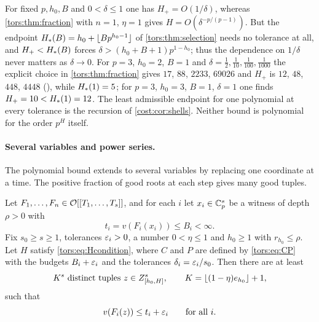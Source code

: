 \begin{remark}
For fixed $p,h_0,B$ and $0<\delta\le1$ one has $H_+=O(1/\delta)$, whereas
\cref{tors:thm:fraction} with $n=1$, $\eta=1$ gives $H=O(\delta^{-p/(p-1)})$. But the
endpoint $H_{*}(B)=h_0+\lfloor Bp^{h_0-1}\rfloor$ of \cref{tors:thm:selection} needs no
tolerance at all, and $H_+<H_{*}(B)$ forces $\delta>(h_0+B+1)p^{1-h_0}$; thus the dependence on $1/\delta$ never matters as $\delta\to0$. For
$p=3$, $h_0=2$, $B=1$ and $\delta=\tfrac12,\tfrac1{10},\tfrac1{100},\tfrac1{1000}$ the
explicit choice in \cref{tors:thm:fraction} gives $17$, $88$, $2233$, $69026$ and $H_+$ is
$12$, $48$, $448$, $4448$
(), while
$H_{*}(1)=5$; for $p=3$, $h_0=3$, $B=1$, $\delta=1$ one finds $H_+=10<H_{*}(1)=12$.
The least admissible endpoint for one polynomial at every tolerance is the recursion of
\cref{cost:cor:shells}. Neither bound is polynomial for the order $p^H$ itself.
\end{remark}


\paragraph{Several variables and power series.}
The polynomial bound extends to several variables by replacing one coordinate at a time.
The positive fraction of good roots at each step gives many good tuples.

\begin{theorem}\label{tors:thm:packet}
Let $F_1,\dots,F_n\in\mathcal{O}[[T_1,\dots,T_s]]$, and for each $i$ let $x_i\in\mathbb{C}_p^s$ be a
witness of depth $\rho>0$ with
\[
  t_i=v(F_i(x_i))\le B_i<\infty .
\]
Fix $s_0\ge s\ge1$, tolerances $\varepsilon_i>0$, a number $0<\eta\le1$ and $h_0\ge1$ with
$r_{h_0}\le\rho$. Let $H$ satisfy \eqref{tors:eq:Hcondition}, where $C$ and $P$ are
defined by \eqref{tors:eq:CP} with the budgets $B_i+\varepsilon_i$ and the tolerances
$\delta_i=\varepsilon_i/s_0$. Then there are at least
\[
  K^s\ \text{distinct tuples }z\in Z_{[h_0,H]}^s,\qquad
  K=\lfloor(1-\eta)e_{h_0}\rfloor+1,
\]
such that
\[
  v(F_i(z))\le t_i+\varepsilon_i\qquad\text{for all }i .
\]
\end{theorem}

